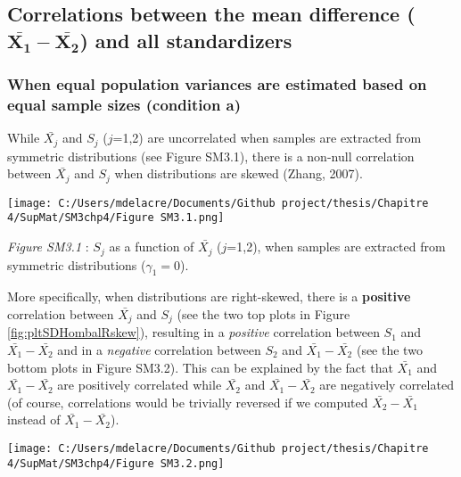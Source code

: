 \documentclass[
  english,
  man,mask,floatsintext]{apa6}
\begin{document}
\hypertarget{correlations-between-the-mean-difference-bmbarx_1-barx_2-and-all-standardizers}{%
\subsection{\texorpdfstring{Correlations between the mean difference (\(\bm{\bar{X_1}-\bar{X_2}}\)) and all standardizers}{Correlations between the mean difference (\textbackslash bm\{\textbackslash bar\{X\_1\}-\textbackslash bar\{X\_2\}\}) and all standardizers}}\label{correlations-between-the-mean-difference-bmbarx_1-barx_2-and-all-standardizers}}

\hypertarget{when-equal-population-variances-are-estimated-based-on-equal-sample-sizes-condition-a}{%
\subsubsection{When equal population variances are estimated based on equal sample sizes (condition a)}\label{when-equal-population-variances-are-estimated-based-on-equal-sample-sizes-condition-a}}

While \(\bar{X_j}\) and \(S_j\) (\(j\)=1,2) are uncorrelated when samples are extracted from symmetric distributions (see Figure SM3.1), there is a non-null correlation between \(\bar{X_j}\) and \(S_j\) when distributions are skewed (Zhang, 2007).

\texttt{[image: C:/Users/mdelacre/Documents/Github project/thesis/Chapitre 4/SupMat/SM3chp4/Figure SM3.1.png]}

\setlength\parindent{0pt}\emph{Figure SM3.1} : \(S_j\) as a function of \(\bar{X_j}\) (\(j\)=1,2), when samples are extracted from symmetric distributions (\(\gamma_1 = 0\)).

\setlength\parindent{24pt}More specifically, when distributions are right-skewed, there is a \textbf{positive} correlation between \(\bar{X_j}\) and \(S_j\) (see the two top plots in Figure \ref{fig:pltSDHombalRskew}), resulting in a \emph{positive} correlation between \(S_1\) and \(\bar{X_1}-\bar{X_2}\) and in a \emph{negative} correlation between \(S_2\) and \(\bar{X_1}-\bar{X_2}\) (see the two bottom plots in Figure SM3.2). This can be explained by the fact that \(\bar{X_1}\) and \(\bar{X_1}-\bar{X_2}\) are positively correlated while \(\bar{X_2}\) and \(\bar{X_1}-\bar{X_2}\) are negatively correlated (of course, correlations would be trivially reversed if we computed \(\bar{X_2}-\bar{X_1}\) instead of \(\bar{X_1}-\bar{X_2}\)).

\texttt{[image: C:/Users/mdelacre/Documents/Github project/thesis/Chapitre 4/SupMat/SM3chp4/Figure SM3.2.png]}
\end{document}
